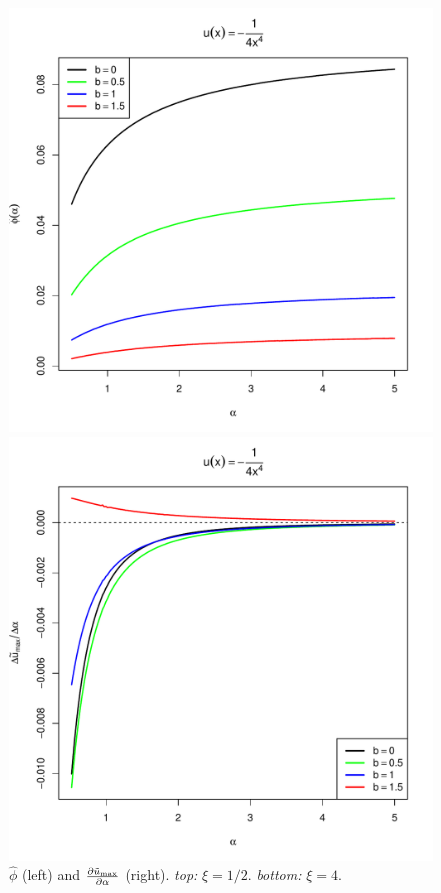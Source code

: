 \documentclass[11pt,a4]{amsart}
\newcommand{\pd}{\partial}
\newcommand{\1}{{\mathbf 1}}
\begin{document}
\begin{figure}[htb!]
\begin{minipage}{0.5\linewidth}
  \end{minipage}
  \begin{minipage}{0.5\linewidth}
    \includegraphics[width=\textwidth]{phi_hat_b_t_power4.pdf}
  \end{minipage}\hfill
  \begin{minipage}{0.5\linewidth}
    \includegraphics[width=\textwidth]{U_b_t_power4.pdf}
  \end{minipage}
  \caption{$\hat\phi$ (left) and ${\pd \tilde u_{\rm max} \over \pd
      \alpha}$ (right). {\em top:} $\xi = 1/2$. {\em bottom:} $\xi =
    4$.
  }
  \label{fig:htfg}
\end{figure}
\end{document}
